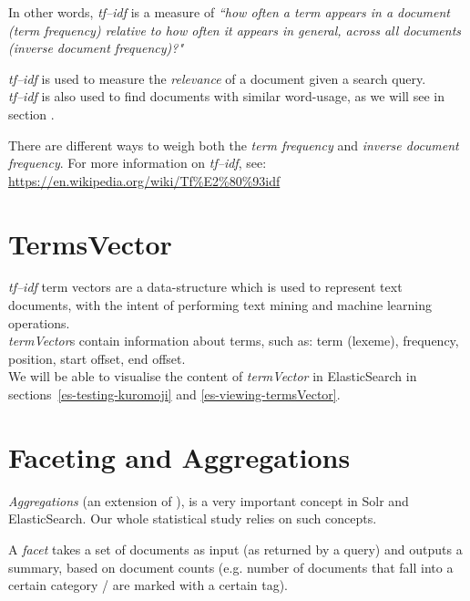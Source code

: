 In other words, \emph{tf–idf} is a measure of \emph{``how often a \emph{term} appears in a document \emph{(term frequency)} relative to how often it appears in general, across all documents \emph{(inverse document frequency)}?"}

\emph{tf–idf} is used to measure the \emph{relevance} of a document given a search query. \\

\emph{tf–idf} is also used to find documents with similar word-usage, as we will see in section \emph{}.

\bigskip

There are different ways to weigh both the \emph{term frequency} and \emph{inverse document frequency}. For more information on \emph{tf–idf}, see: \\
\phantom{.} \hfill
\url{https://en.wikipedia.org/wiki/Tf%E2%80%93idf}





\section{TermsVector}

\emph{tf–idf} term vectors are a data-structure which is used to represent text documents, with the intent of performing text mining and machine learning operations. \\

\emph{termVector}s contain information about terms, such as: term (lexeme), frequency, position, start offset, end offset. \\

We will be able to visualise the content of \emph{termVector} in ElasticSearch in sections~\ref{es-testing-kuromoji} and \ref{es-viewing-termsVector}.


\bigskip


\section{Faceting and Aggregations} \label{faceting-and-aggregation}


\emph{Aggregations} (an extension of \faceting), is a very important concept in Solr and ElasticSearch. Our whole statistical study relies on such concepts. \\

\medskip

A \emph{facet} takes a set of documents as input (as returned by a query) and outputs a summary, based on document counts (e.g. number of documents that fall into a certain category / are marked with a certain tag). \\



